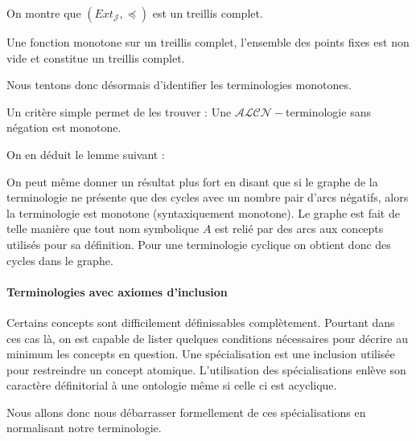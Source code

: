 \par On montre que $(Ext_\mathcal{J}, \preceq)$ est un treillis complet.

{
  Une fonction monotone sur un treillis complet, l'ensemble des points fixes est non vide et constitue un treillis complet.
}



\par Nous tentons donc désormais d'identifier les terminologies monotones.
\par Un critère simple permet de les trouver : Une $\mathcal{ALCN}-$terminologie sans négation est monotone.

\par On en déduit le lemme suivant :


\par On peut même donner un résultat plus fort en disant que si le graphe de la terminologie ne présente que des cycles avec un nombre pair d'arcs négatifs, alors la terminologie est monotone (syntaxiquement monotone). Le graphe est fait de telle manière que tout nom symbolique $A$ est relié par des arcs aux concepts utilisés pour sa définition. Pour une terminologie cyclique on obtient donc des cycles dans le graphe.

\paragraph{Terminologies avec axiomes d'inclusion}
\label{sec:term-avec-axiom}

\par Certains concepts sont difficilement définissables complètement. Pourtant dans ces cas là, on est capable de lister quelques conditions nécessaires pour décrire au minimum les concepts en question. Une spécialisation est une inclusion utilisée pour restreindre un concept atomique. L'utilisation des spécialisations enlève son caractère définitorial à une ontologie même si celle ci est acyclique.
\par Nous allons donc nous débarrasser formellement de ces spécialisations en normalisant notre terminologie.


